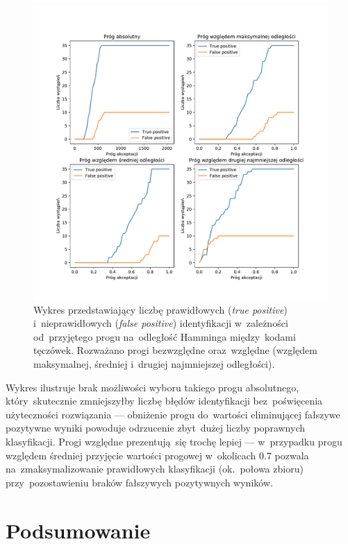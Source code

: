 \documentclass[11pt,a4paper]{article}
\begin{document}
\begin{figure}
    \centering
    \includegraphics[width=\textwidth]{res/img/false-true-positives.pdf}
    \caption{
        Wykres przedstawiający liczbę prawidłowych (\emph{true positive}) i~nieprawidłowych (\emph{false positive}) identyfikacji w~zależności od~przyjętego progu na~odległość Hamminga między~kodami tęczówek.
        Rozważano progi bezwzględne oraz~względne (względem maksymalnej, średniej i~drugiej najmniejszej odległości).
    }
    \label{fig:false-true-positives}
\end{figure}

Wykres ilustruje brak możliwości wyboru takiego progu absolutnego, który~skutecznie zmniejszyłby liczbę błędów identyfikacji bez~poświęcenia użyteczności rozwiązania --- obniżenie progu do~wartości eliminującej fałszywe pozytywne wyniki powoduje odrzucenie zbyt~dużej liczby poprawnych klasyfikacji.
Progi względne prezentują~się trochę lepiej --- w~przypadku progu względem średniej przyjęcie wartości progowej w~okolicach 0.7 pozwala na~zmaksymalizowanie prawidłowych klasyfikacji (ok.~połowa zbioru) przy~pozostawieniu braków fałszywych pozytywnych wyników.

\section{Podsumowanie}
\end{document}
